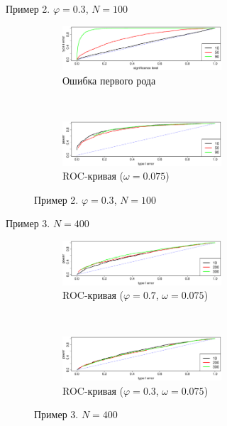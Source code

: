 \documentclass[notheorems, handout]{beamer}
\begin{document}
\begin{frame}{Пример 2. $\varphi=0.3$, $N=100$}
	\begin{figure}
		\centering
		\begin{subfigure}[t]{\textwidth}
			\centering
			\includegraphics[width=0.65\textwidth]{images/alphaI_phi3_N100.eps}
			\caption{Ошибка первого рода}
		\end{subfigure}\\
		\begin{subfigure}[t]{\textwidth}
			\centering
			\includegraphics[width=0.65\textwidth]{images/roc_phi3_N100.eps}
			\caption{ROC-кривая ($\omega = 0.075$)}
		\end{subfigure}\hspace{\fill}
		\caption{Пример 2. $\varphi = 0.3$, $N=100$}
	\end{figure}
\end{frame}

\begin{frame}{Пример 3. $N=400$}
	\begin{figure}
		\centering
		\begin{subfigure}[t]{\textwidth}
			\centering
			\includegraphics[width=0.65\textwidth]{images/roc_phi7_N400.eps}
			\caption{ROC-кривая ($\varphi = 0.7$, $\omega = 0.075$)}
		\end{subfigure}\\
		\begin{subfigure}[t]{\textwidth}
			\centering
			\includegraphics[width=0.65\textwidth]{images/roc_phi3_N400.eps}
			\caption{ROC-кривая ($\varphi = 0.3$, $\omega = 0.075$)}
		\end{subfigure}\hspace{\fill}
		\caption{Пример 3. $N=400$}
	\end{figure}
\end{frame}
\end{document}
